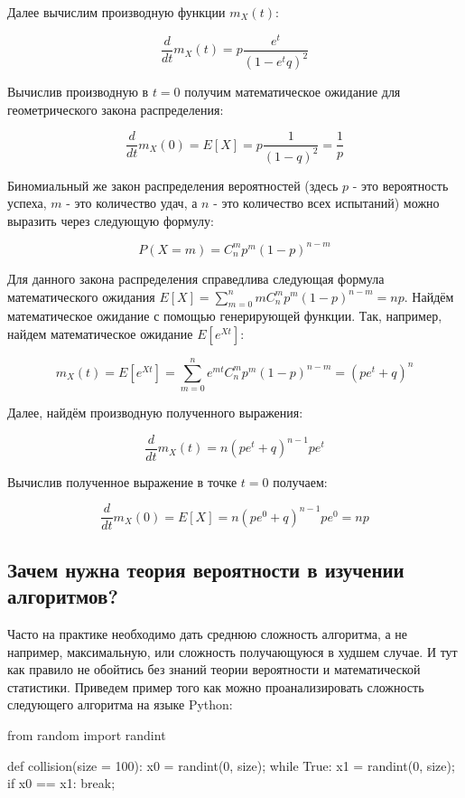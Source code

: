 Далее вычислим производную функции $m_X(t)$:

$$\frac{d}{dt}m_X(t) = p\frac{e^t}{(1-e^tq)^2}$$

Вычислив производную в $t=0$ получим математическое ожидание для
геометрического закона распределения:

$$\frac{d}{dt}m_X(0) = E[X] = p\frac{1}{(1-q)^2}=\frac{1}{p}$$

Биномиальный же закон распределения вероятностей (здесь $p$ - это вероятность успеха, 
$m$ - это количество удач, а $n$ - это количество всех испытаний) можно выразить через 
следующую формулу:

$$P(X=m)=C^m_np^{m}(1-p)^{n-m}$$

Для данного закона распределения справедлива следующая формула математического 
ожидания $E[X]=\sum_{m=0}^n mC^m_np^{m}(1-p)^{n-m} = np$.  Найдём математическое 
ожидание с помощью генерирующей функции. Так, например, найдем математическое 
ожидание $E[e^{Xt}]$:

$$m_X(t) = E[e^{Xt}] = \sum_{m=0}^n e^{mt}C^m_np^{m}(1-p)^{n-m} = (pe^t+q)^n$$

Далее, найдём производную полученного выражения:

$$\frac{d}{dt}m_X(t) = n(pe^t+q)^{n-1}pe^t$$

Вычислив полученное выражение в точке $t=0$ получаем: 

$$\frac{d}{dt}m_X(0) = E[X] = n(pe^0+q)^{n-1}pe^0 = np$$

\subsection{Зачем нужна теория вероятности в изучении алгоритмов?}

Часто на практике необходимо дать среднюю сложность алгоритма,
а не например, максимальную, или сложность получающуюся в худшем случае. 
И тут как правило не обойтись без знаний теории вероятности и 
математической статистики. Приведем пример того как можно 
проанализировать сложность следующего алгоритма на языке Python:

\begin{python}
from random import randint

def collision(size = 100):
	x0 = randint(0, size);
	while True:
		x1 = randint(0, size);
		if x0 == x1:
			break;
\end{python}

